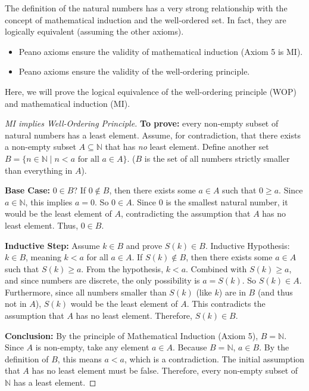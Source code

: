 The definition of the natural numbers has a very strong relationship with the concept of mathematical induction and the well-ordered set. In fact, they are logically equivalent (assuming the other axioms).
\begin{itemize}
    \item Peano axioms ensure the validity of mathematical induction (Axiom 5 is MI).
    \item Peano axioms ensure the validity of the well-ordering principle.
\end{itemize}

Here, we will prove the logical equivalence of the well-ordering principle (WOP) and mathematical induction (MI).

\begin{proof}[MI implies Well-Ordering Principle]
\textbf{To prove:} every non-empty subset of natural numbers has a least element.
Assume, for contradiction, that there exists a non-empty subset $A \subseteq \mathbb{N}$ that has \emph{no} least element.
Define another set $B = \{ n \in \mathbb{N} \mid n < a \text{ for all } a \in A \}$. ($B$ is the set of all numbers strictly smaller than everything in $A$).

\textbf{Base Case:} $0 \in B$?
If $0 \notin B$, then there exists some $a \in A$ such that $0 \ge a$. Since $a \in \mathbb{N}$, this implies $a=0$. So $0 \in A$. Since 0 is the smallest natural number, it would be the least element of $A$, contradicting the assumption that $A$ has no least element. Thus, $0 \in B$.

\textbf{Inductive Step:} Assume $k \in B$ and prove $S(k) \in B$.
Inductive Hypothesis: $k \in B$, meaning $k < a$ for all $a \in A$.
If $S(k) \notin B$, then there exists some $a \in A$ such that $S(k) \ge a$.
From the hypothesis, $k < a$. Combined with $S(k) \ge a$, and since numbers are discrete, the only possibility is $a = S(k)$.
So $S(k) \in A$. Furthermore, since all numbers smaller than $S(k)$ (like $k$) are in $B$ (and thus not in $A$), $S(k)$ would be the least element of $A$.
This contradicts the assumption that $A$ has no least element. Therefore, $S(k) \in B$.

\textbf{Conclusion:} By the principle of Mathematical Induction (Axiom 5), $B = \mathbb{N}$.
Since $A$ is non-empty, take any element $a \in A$. Because $B = \mathbb{N}$, $a \in B$.
By the definition of $B$, this means $a < a$, which is a contradiction.
The initial assumption that $A$ has no least element must be false.
Therefore, every non-empty subset of $\mathbb{N}$ has a least element.
\end{proof}

